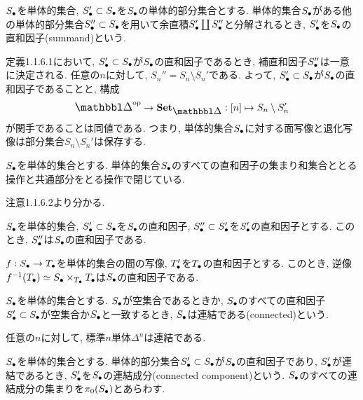\documentclass[uplatex, a4paper, 14Q, dvipdfmx]{jsreport}
\begin{document}
\begin{definition}
  $\S$を単体的集合, $\S' \subset \S$を$\S$の単体的部分集合とする. 
  単体的集合$\S$がある他の単体的部分集合$\S'' \subset \S$を用いて余直積$\S' \coprod \S''$と分解されるとき, $\S'$を$\S$の直和因子(summand)という. 
\end{definition}

\begin{remark}
  定義1.1.6.1において, $\S' \subset \S$が$\S$の直和因子であるとき, 補直和因子$\S''$は一意に決定される. 
  任意の$n$に対して, $S_n'' = S_n \setminus S_n'$である. 
  よって, $\S' \subset \S$が$\S$の直和因子であることと, 構成
  \begin{align*}
    \simop \to \sset: [n] \mt S_n \setminus S_n'
  \end{align*}
  が関手であることは同値である. 
  つまり, 単体的集合$\S$に対する面写像と退化写像は部分集合$S_n \setminus S_n'$は保存する. 
\end{remark}

\begin{remark}
  $\S$を単体的集合とする. 
  単体的集合$\S$のすべての直和因子の集まり和集合ととる操作と共通部分をとる操作で閉じている. 
\end{remark}

\begin{Proof}
  注意1.1.6.2より分かる. 
\end{Proof}

\begin{remark}
  $\S$を単体的集合, $\S' \subset \S$を$\S$の直和因子, $\S'' \subset \S'$を$\S'$の直和因子とする. 
  このとき, $\S''$は$\S$の直和因子である. 
\end{remark}

\begin{remark}
  $f: \S \to \T$を単体的集合の間の写像, $\T'$を$\T$の直和因子とする. 
  このとき, 逆像$f^{-1}(\T) \simeq \S \ti_{\T} \T$は$\S$の直和因子である. 
\end{remark}

\begin{definition}
  $\S$を単体的集合とする. 
  $\S$が空集合であるときか, $\S$のすべての直和因子$\S' \subset \S$が空集合か$\S$と一致するとき, $\S$は連結である(connected)という.  
\end{definition}

\begin{example}
  任意の$n$に対して, 標準$n$単体$\Delta^n$は連結である.
\end{example}

\begin{definition}
  $\S$を単体的集合とする. 
  単体的部分集合$\S' \subset \S$が$\S$の直和因子であり, $\S'$が連結であるとき, $\S'$を$\S$の連結成分(connected component)という. 
  $\S$のすべての連結成分の集まりを$\pi_0(\S)$とあらわす. 
\end{definition}
\end{document}
